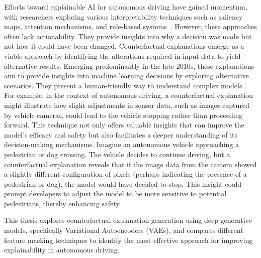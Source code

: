 Efforts toward explainable AI for autonomous driving have gained momentum, with researchers exploring various interpretability techniques such as saliency maps, attention mechanisms, and rule-based systems~\autocite{bojarski2016endendlearningselfdriving, Ribeiro2018}. However, these approaches often lack actionability. They provide insights into why a decision was made but not how it could have been changed. Counterfactual explanations emerge as a viable approach by identifying the alterations required in input data to yield alternative results. Emerging predominantly in the late 2010s, these explanations aim to provide insights into machine learning decisions by exploring alternative scenarios. They present a human-friendly way to understand complex models \autocite{yeshwanth2023counterfactual}. For example, in the context of autonomous driving, a counterfactual explanation might illustrate how slight adjustments in sensor data, such as images captured by vehicle cameras, could lead to the vehicle stopping rather than proceeding forward. This technique not only offers valuable insights that can improve the model's efficacy and safety but also facilitates a deeper understanding of its decision-making mechanisms. Imagine an autonomous vehicle approaching a pedestrian or dog crossing. The vehicle decides to continue driving, but a counterfactual explanation reveals that if the image data from the camera showed a slightly different configuration of pixels (perhaps indicating the presence of a pedestrian or dog), the model would have decided to stop. This insight could prompt developers to adjust the model to be more sensitive to potential pedestrians, thereby enhancing safety.

This thesis explores counterfactual explanation generation using deep generative models, specifically Variational Autoencoders (VAEs), and compares different feature masking techniques to identify the most effective approach for improving explainability in autonomous driving.





